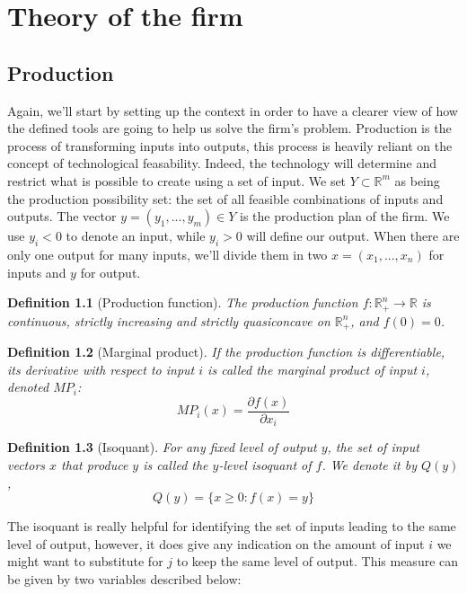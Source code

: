 \documentclass[12pt]{report}
\newtheorem{definition}{Definition}[chapter]
\begin{document}
\chapter{Theory of the firm}

\section{Production}

Again, we'll start by setting up the context in order to have a clearer view of how the defined tools are going to help us solve the firm's problem. Production is the process of transforming inputs into outputs, this process is heavily reliant on the concept of technological feasability. Indeed, the technology will determine and restrict what is possible to create using a set of input. We set $Y\subset\mathbb{R}^m$ as being the production possibility set: the set of all feasible combinations of inputs and outputs. The vector $y = (y_1, ..., y_m)\in Y$ is the production plan of the firm. We use $y_i < 0$ to denote an input, while $y_i > 0$ will define our output. When there are only one output for many inputs, we'll divide them in two $x = (x_1, ..., x_n)$ for inputs and $y$ for output.

\begin{definition}[Production function]
The production function $f:\mathbb{R}_+^n\to\mathbb{R}$ is continuous, strictly increasing and strictly quasiconcave on $\mathbb{R}_+^n$, and $f(0) = 0$.
\end{definition}

\begin{definition}[Marginal product]
If the production function is differentiable, its derivative with respect to input $i$ is called the marginal product of input $i$, denoted $MP_i$: $$MP_i(x) = \frac{\partial f(x)}{\partial x_i} $$
\end{definition}

\begin{definition}[Isoquant]
For any fixed level of output $y$, the set of input vectors $x$ that produce $y$ is called the $y$-level isoquant of $f$. We denote it by $Q(y)$, $$Q(y) = \{x\geq 0 : f(x) = y\} $$
\end{definition}

The isoquant is really helpful for identifying the set of inputs leading to the same level of output, however, it does give any indication on the amount of input $i$ we might want to substitute for $j$ to keep the same level of output. This measure can be given by two variables described below:
\end{document}
